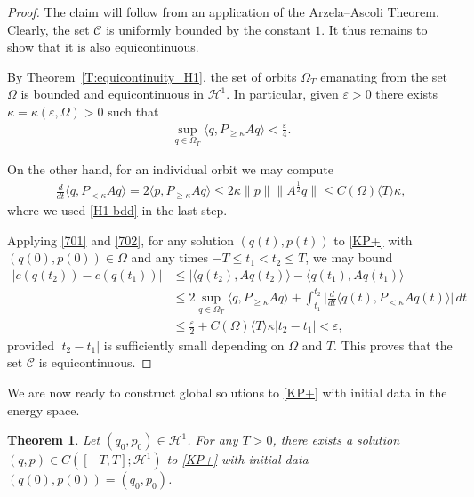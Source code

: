 \documentclass{amsart}
\newcommand{\eps}{\varepsilon}
\newtheorem{theorem}{Theorem}[section]
\theoremstyle{definition}
\numberwithin{equation}{section}
\renewcommand{\H}{\mathcal H}
\newcommand{\la}{\langle}
\newcommand{\ra}{\rangle}
\begin{document}
\begin{proof}
The claim will follow from an application of the Arzela--Ascoli Theorem. Clearly, the set $\mathcal C$ is uniformly bounded by the constant $1$.  It thus remains to show that it is also equicontinuous.

By Theorem~\ref{T:equicontinuity_H1}, the set of orbits $\Omega_T$ emanating from the set $\Omega$ is bounded and equicontinuous in $\H^1$.  In particular, given $\eps>0$ there exists $\kappa=\kappa(\eps, \Omega)>0$ such that
\begin{align}\label{701}
\sup_{q\in \Omega_T} \la q, P_{\geq \kappa} A q\ra <\tfrac\eps4.
\end{align}

On the other hand, for an individual orbit we may compute
\begin{align}\label{702}
\tfrac{d}{dt} \la q, P_{< \kappa} A q\ra = 2\la p, P_{\geq \kappa} A q\ra\leq 2\kappa\|p\|\|A^{\frac12}q\|\leq C(\Omega)\la T\ra  \kappa,
\end{align}
where we used \eqref{H1 bdd} in the last step.

Applying \eqref{701} and \eqref{702}, for any solution $(q(t),p(t))$ to \eqref{KP+} with $(q(0),p(0))\in \Omega$ and any times $-T\leq t_1<t_2\leq T$, we may bound
\begin{align*}
\bigl| c(q(t_2)) -c(q(t_1))\bigr|
&\leq \bigl| \la q(t_2), A q(t_2) \ra - \la q(t_1), A q(t_1) \ra\bigr| \\
&\leq 2 \sup_{q\in \Omega_T} \la q, P_{\geq \kappa} A q\ra + \int_{t_1}^{t_2} \bigl|\tfrac{d}{dt} \la q(t), P_{< \kappa} A q(t)\ra\bigr|\, dt\\
&\leq \tfrac\eps2 + C(\Omega)\la T\ra \kappa |t_2-t_1|<\eps,
\end{align*}
provided $|t_2-t_1|$ is sufficiently small depending on $\Omega$ and $T$. This proves that the set $\mathcal C$ is equicontinuous.
\end{proof}

We are now ready to construct global solutions to \eqref{KP+} with initial data in the energy space.

\begin{theorem}\label{T:H1 exist}
Let $(q_0,p_0) \in \H^{1}$. For any $T>0$, there exists a solution $(q,p) \in C([-T,T];\H^1)$ to \eqref{KP+} with initial data $(q(0),p(0))= (q_0,p_0)$.
\end{theorem}
\end{document}
